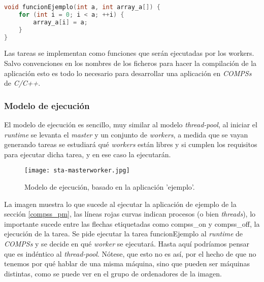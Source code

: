 \begin{lstlisting}[caption={Implementación de la función 'funcionEjemplo'}, captionpos=b, label={lst:ejemplo-functions.cc}, language=C++]
void funcionEjemplo(int a, int array_a[]) {
    for (int i = 0; i < a; ++i) {
        array_a[i] = a;
    }
}
\end{lstlisting}

Las tareas se implementan como funciones que serán ejecutadas por los workers. Salvo convenciones en los nombres de los ficheros para hacer la compilación de la aplicación esto es todo lo necesario para desarrollar una aplicación en \textit{COMPSs} de \textit{C/C++}.

\begin{comment}
\subsubsection{Compilación}

Para compilar la aplicacion en \textit{COMPSs} de \textit{C/C++}, 

\begin{figure}[H]
    \centering
    \caption{Proceso de compilado de una aplicación COMPSs C/C++}
    \texttt{[image: proceso\_compilado.jpg]}
    \label{fig:proceso_compilado}
\end{figure}
\end{comment}

\subsubsection{Modelo de ejecución}

El modelo de ejecución es sencillo, muy similar al modelo \textit{thread-pool}, al iniciar el \textit{runtime} se levanta el \textit{master} y un conjunto de \textit{workers}, a medida que se vayan generando tareas se estudiará qué \textit{workers} están libres y si cumplen los requisitos para ejecutar dicha tarea, y en ese caso la ejecutarán. 

\begin{figure}[H]
    \centering 
    \caption{Modelo de ejecución, basado en la aplicación 'ejemplo'.}
    \texttt{[image: sta-masterworker.jpg]}
    \label{fig:masterworker_pool}
\end{figure}

La imagen muestra lo que sucede al ejecutar la aplicación de ejemplo de la sección \ref{compss_pm}, las líneas rojas curvas indican procesos (o bien \textit{threads}), lo importante sucede entre las flechas etiquetadas como compss\_on y compss\_off, la ejecución de la tarea. Se pide ejecutar la tarea funcionEjemplo al \textit{runtime} de \textit{COMPSs} y se decide en qué \textit{worker} se ejecutará. Hasta aquí podríamos pensar que es indéntico al \textit{thread-pool}. Nótese, que esto no es así, por el hecho de que no tenemos por qué hablar de una misma máquina, sino que pueden ser máquinas distintas, como se puede ver en el grupo de ordenadores de la imagen. 
\par\bigskip

